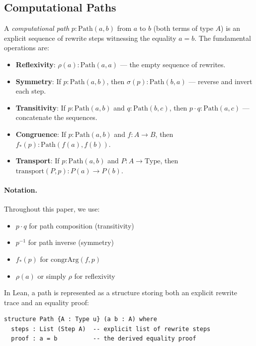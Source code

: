 \documentclass{lmcs}
\theoremstyle{definition}
\theoremstyle{plain}
\theoremstyle{remark}
\newcommand{\refl}{\rho}
\newcommand{\sym}{\sigma}
\newcommand{\Path}{\mathrm{Path}}
\begin{document}
\subsection{Computational Paths}

A \emph{computational path} $p : \Path(a, b)$ from $a$ to $b$ (both terms of type $A$) is an explicit sequence of rewrite steps witnessing the equality $a = b$. The fundamental operations are:

\begin{itemize}
    \item \textbf{Reflexivity}: $\refl(a) : \Path(a, a)$ --- the empty sequence of rewrites.
    \item \textbf{Symmetry}: If $p : \Path(a, b)$, then $\sym(p) : \Path(b, a)$ --- reverse and invert each step.
    \item \textbf{Transitivity}: If $p : \Path(a, b)$ and $q : \Path(b, c)$, then $p \cdot q : \Path(a, c)$ --- concatenate the sequences.
    \item \textbf{Congruence}: If $p : \Path(a, b)$ and $f : A \to B$, then $f_*(p) : \Path(f(a), f(b))$.
    \item \textbf{Transport}: If $p : \Path(a, b)$ and $P : A \to \mathrm{Type}$, then $\mathrm{transport}(P, p) : P(a) \to P(b)$.
\end{itemize}

\paragraph{Notation.} Throughout this paper, we use:
\begin{itemize}
    \item $p \cdot q$ for path composition (transitivity)
    \item $p^{-1}$ for path inverse (symmetry)
    \item $f_*(p)$ for $\mathrm{congrArg}(f, p)$
    \item $\refl(a)$ or simply $\refl$ for reflexivity
\end{itemize}

In Lean, a path is represented as a structure storing both an explicit rewrite trace and an equality proof:
\begin{lstlisting}
structure Path {A : Type u} (a b : A) where
  steps : List (Step A)  -- explicit list of rewrite steps
  proof : a = b          -- the derived equality proof
\end{lstlisting}
\end{document}
